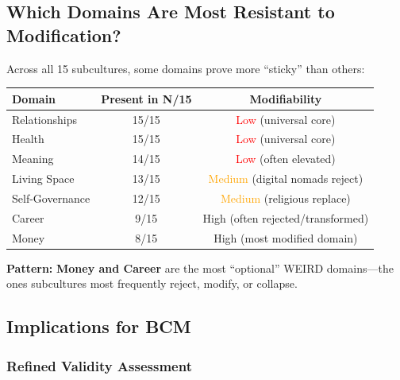 \subsection{Which Domains Are Most Resistant to Modification?}

Across all 15 subcultures, some domains prove more ``sticky'' than others:

\begin{center}
\begin{tabular}{@{}lcc@{}}
\toprule
\textbf{Domain} & \textbf{Present in N/15} & \textbf{Modifiability} \\
\midrule
Relationships & 15/15 & \textcolor{red}{Low} (universal core) \\
Health & 15/15 & \textcolor{red}{Low} (universal core) \\
Meaning & 14/15 & \textcolor{red}{Low} (often elevated) \\
Living Space & 13/15 & \textcolor{orange}{Medium} (digital nomads reject) \\
Self-Governance & 12/15 & \textcolor{orange}{Medium} (religious replace) \\
Career & 9/15 & \textcolor{green!70!black}{High} (often rejected/transformed) \\
Money & 8/15 & \textcolor{green!70!black}{High} (most modified domain) \\
\bottomrule
\end{tabular}
\end{center}

\textbf{Pattern:} \textbf{Money and Career} are the most ``optional'' WEIRD domains---the ones subcultures most frequently reject, modify, or collapse.

\subsection{Implications for BCM}

\subsubsection{Refined Validity Assessment}

